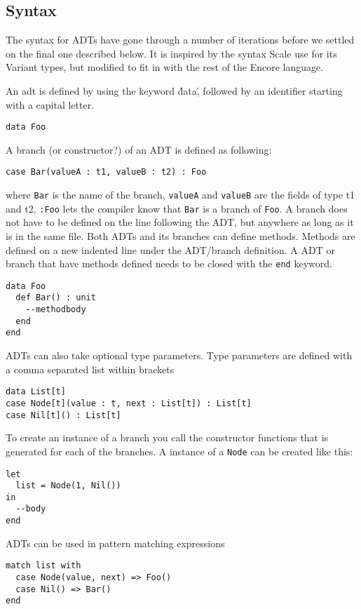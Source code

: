 \documentclass[10pt]{report}
\begin{document}
\subsection{Syntax}
The syntax for ADTs have gone through a number of iterations before we settled on the final one described below.
It is inspired by the syntax Scale use for its Variant types, but modified to fit in with the rest of the Encore language.

An adt is defined by using the keyword \'data\', followed by an identifier starting with a capital letter.
\begin{lstlisting}[language=Encore]
data Foo
\end{lstlisting}
A branch (or constructor?) of an ADT is defined as following:
\begin{lstlisting}[language=Encore]
case Bar(valueA : t1, valueB : t2) : Foo
\end{lstlisting}
where \texttt{Bar} is the name of the branch, \texttt{valueA} and \texttt{valueB} are the fields of type t1 and t2, \texttt{:Foo} lets the compiler know that \texttt{Bar} is a branch of \texttt{Foo}.
A branch does not have to be defined on the line following the ADT, but anywhere as long as it is in the same file.
Both ADTs and its branches can define methods. Methods are defined on a new indented line under the ADT/branch definition.
A ADT or branch that have methods defined needs to be closed with the \texttt{end} keyword.
\begin{lstlisting}[language=encore,caption={ADT definition with a method}]
data Foo
  def Bar() : unit
    --methodbody
  end
end
\end{lstlisting}
ADTs can also take optional type parameters. Type parameters are defined with a comma separated list within brackets
\begin{lstlisting}[language=encore,caption={Generic linked list implemented with an ADT}]
data List[t]
case Node[t](value : t, next : List[t]) : List[t]
case Nil[t]() : List[t]
\end{lstlisting}
To create an instance of a branch you call the constructor functions that is generated for each of the branches.
A instance of a \texttt{Node} can be created like this:
\begin{lstlisting}[language=encore,caption={Declaration of a list containing one element}]
let
  list = Node(1, Nil())
in
  --body
end
\end{lstlisting}
ADTs can be used in pattern matching expressions
\begin{lstlisting}[language=encore,caption={Pattern matching on a linked list}]
match list with
  case Node(value, next) => Foo()
  case Nil() => Bar()
end
\end{lstlisting}
\end{document}
